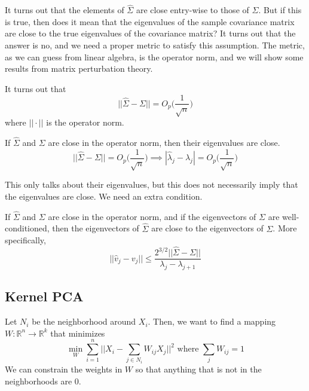 \documentclass{article}
\begin{document}
  It turns out that the elements of $\hat{\Sigma}$ are close entry-wise to those of $\Sigma$. But if this is true, then does it mean that the eigenvalues of the sample covariance matrix are close to the true eigenvalues of the covariance matrix? It turns out that the answer is no, and we need a proper metric to satisfy this assumption. The metric, as we can guess from linear algebra, is the operator norm, and we will show some results from matrix perturbation theory. 

  \begin{lemma}[]
    It turns out that 
    \begin{equation}
      ||\hat{\Sigma} - \Sigma|| = O_p \bigg( \frac{1}{\sqrt{n}} \bigg)
    \end{equation}
    where $|| \cdot ||$ is the operator norm. 
  \end{lemma}

  \begin{theorem}
    If $\hat{\Sigma}$ and $\Sigma$ are close in the operator norm, then their eigenvalues are close. 
    \begin{equation}
      ||\hat{\Sigma} - \Sigma|| = O_p \bigg( \frac{1}{\sqrt{n}} \bigg) \implies |\hat{\lambda}_j - \lambda_j| = O_p \bigg( \frac{1}{\sqrt{n}} \bigg) 
    \end{equation}
  \end{theorem}

  This only talks about their eigenvalues, but this does not necessarily imply that the eigenvalues are close. We need an extra condition. 

  \begin{theorem}
    If $\hat{\Sigma}$ and $\Sigma$ are close in the operator norm, and if the eigenvectors of $\Sigma$ are well-conditioned, then the eigenvectors of $\hat{\Sigma}$ are close to the eigenvectors of $\Sigma$. More specifically, 
    \begin{equation}
      ||\hat{v}_j - v_j|| \leq \frac{2^{3/2} ||\hat{\Sigma} - \Sigma||}{\lambda_j - \lambda_{j+1}}
    \end{equation}
  \end{theorem}

\subsection{Kernel PCA}

  \begin{definition}
    Let $N_i$ be the neighborhood around $X_i$. Then, we want to find a mapping $W: \mathbb{R}^n \rightarrow \mathbb{R}^k$ that minimizes 
    \begin{equation}
      \min_{W} \sum_{i=1}^n \bigg| \bigg| X_i - \sum_{j \in N_i} W_{ij} X_j \bigg| \bigg|^2 \text{ where } \sum_{j} W_{ij} = 1
    \end{equation}
    We can constrain the weights in $W$ so that anything that is not in the neighborhoods are $0$. 
  \end{definition}
\end{document}
